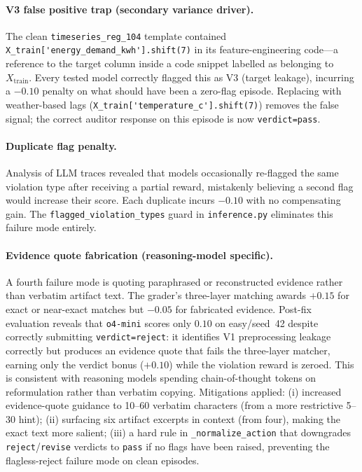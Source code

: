 \documentclass{article}
\begin{document}
\paragraph{V3 false positive trap (secondary variance driver).}
The clean \texttt{timeseries\_reg\_104} template contained
\verb|X_train['energy_demand_kwh'].shift(7)| in its feature-engineering
code---a reference to the target column inside a code snippet labelled
as belonging to $X_\mathrm{train}$.  Every tested model correctly
flagged this as V3 (target leakage), incurring a $-0.10$ penalty on
what should have been a zero-flag episode.
Replacing with weather-based lags (\verb|X_train['temperature_c'].shift(7)|)
removes the false signal; the correct auditor response on this episode
is now \texttt{verdict=pass}.

\paragraph{Duplicate flag penalty.}
Analysis of LLM traces revealed that models occasionally re-flagged
the same violation type after receiving a partial reward, mistakenly
believing a second flag would increase their score.  Each duplicate incurs
$-0.10$ with no compensating gain.  The \texttt{flagged\_violation\_types}
guard in \texttt{inference.py} eliminates this failure mode entirely.

\paragraph{Evidence quote fabrication (reasoning-model specific).}
A fourth failure mode is quoting paraphrased or reconstructed evidence
rather than verbatim artifact text.  The grader's three-layer matching
awards $+0.15$ for exact or near-exact matches but $-0.05$ for
fabricated evidence.
Post-fix evaluation reveals that \texttt{o4-mini} scores only $0.10$ on
easy/seed~42 despite correctly submitting \texttt{verdict=reject}:
it identifies V1 preprocessing leakage correctly but produces an evidence
quote that fails the three-layer matcher, earning only the verdict bonus ($+0.10$)
while the violation reward is zeroed.
This is consistent with reasoning models spending chain-of-thought tokens on
reformulation rather than verbatim copying.
Mitigations applied: (i) increased evidence-quote guidance to 10--60 verbatim characters
(from a more restrictive 5--30 hint); (ii) surfacing six artifact excerpts in context
(from four), making the exact text more salient; (iii) a hard rule in
\texttt{\_normalize\_action} that downgrades \texttt{reject}/\texttt{revise} verdicts
to \texttt{pass} if no flags have been raised, preventing the flagless-reject
failure mode on clean episodes.
\end{document}

